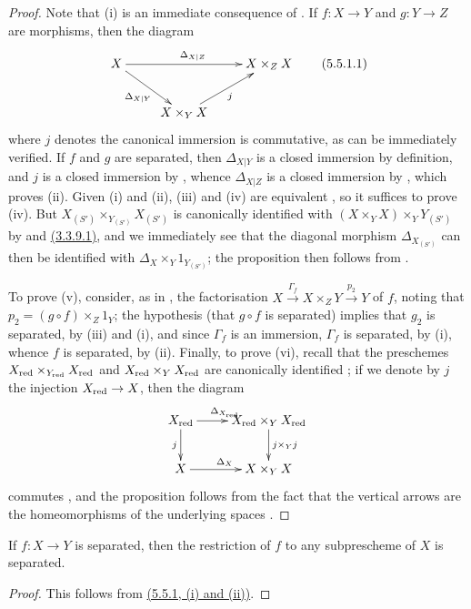 \begin{proof}
\label{proof-1.5.5.1}
Note that (i) is an immediate consequence of .
If $f:X\to Y$ and $g:Y\to Z$ are morphisms, then the diagram
\[
  \xymatrix{
    X\ar[rr]^{\Delta_{X|Z}}\ar[dr]_{\Delta_{X|Y}} & &
    X\times_Z X\\
    & X\times_Y X\ar[ur]_j
  }
  \tag{5.5.1.1}
\]
where $j$ denotes the canonical immersion  is commutative, as can be immediately verified.
If $f$ and $g$ are separated, then $\Delta_{X|Y}$ is a closed immersion by definition, and $j$ is a closed immersion by , whence $\Delta_{X|Z}$ is a closed immersion by , which
proves (ii).
Given (i) and (ii), (iii) and (iv) are equivalent , so it suffices to prove (iv).
But $X_{(S')}\times_{Y_{(S')}}X_{(S')}$ is canonically identified with $(X\times_Y X)\times_Y Y_{(S')}$ by  and \hyperref[1.3.3.9]{(3.3.9.1)}, and we immediately see that the diagonal morphism $\Delta_{X_{(S')}}$ can then be identified with $\Delta_X\times_Y 1_{Y_{(S')}}$;
the proposition then follows from .

To prove (v), consider, as in , the factorisation $X\xrightarrow{\Gamma_f}X\times_Z Y\xrightarrow{p_2}Y$ of $f$, noting that $p_2=(g\circ f)\times_Z 1_Y$;
the hypothesis (that $g\circ f$ is separated) implies that $g_2$ is separated, by (iii) and (i), and since $\Gamma_f$ is an immersion, $\Gamma_f$ is separated, by (i), whence $f$ is separated, by (ii).
Finally, to prove (vi), recall that the preschemes $X_{\mathrm{red}}\times_{Y_{\mathrm{red}}}X_{\mathrm{red}}$ and $X_{\mathrm{red}}\times_Y X_{\mathrm{red}}$ are canonically identified ;
if we denote by $j$ the injection $X_\red\to X$, then the diagram
\[
  \xymatrix{
    X_\red\ar[r]^{\Delta_{X_\red}}\ar[d]_j &
    X_\red\times_Y X_\red\ar[d]^{j\times_Y j}\\
    X\ar[r]^{\Delta_X} &
    X\times_Y X
  }
\]
commutes , and the proposition follows from the fact that the vertical arrows are the homeomorphisms of the underlying spaces .
\end{proof}

\begin{cor}[5.5.2]
\label{1.5.5.2}
If $f:X\to Y$ is separated, then the restriction of $f$ to any subprescheme of $X$ is separated.
\end{cor}

\begin{proof}
\label{proof-1.5.5.2}
This follows from \hyperref[1.5.5.1]{(5.5.1, (i) and (ii))}.
\end{proof}

